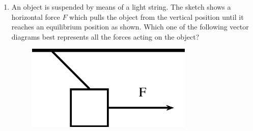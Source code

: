         
        \label{m38819*id197042}\begin{enumerate}[noitemsep, label=\textbf{\arabic*}. ] 
            \label{m38819*uid85}\item An object is suspended by means of a light string. The sketch shows a horizontal force \begin{math}F\end{math} which pulls the object from the vertical position until it reaches an equilibrium position as shown. Which one of the following vector diagrams best represents all the forces acting on the object?

    \setcounter{subfigure}{0}


	\begin{figure}[H] %
    \begin{center}
    \label{m38819*id197072!!!underscore!!!media}\label{m38819*id197072!!!underscore!!!printimage}\includegraphics[width=300px]{col11305.imgs/m38819_PG11C1_072.png} %
        
      \vspace{2pt}
    \vspace{.1in}
    
    \end{center}

 \end{figure}   

    \addtocounter{footnote}{-0}
    
    
      

\end{enumerate}
